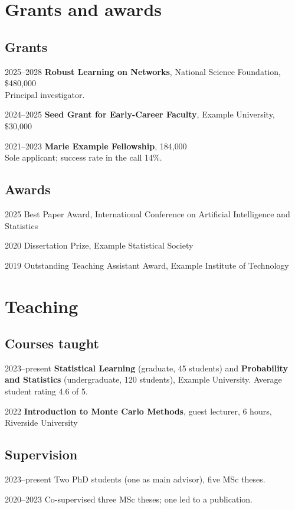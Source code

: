 \documentclass[11pt,a4paper]{article}
\begin{document}
\section{Grants and awards}
\subsection{Grants}
\begin{cvlist}
  \item[2025--2028] \textbf{Robust Learning on Networks}, National Science Foundation, \$480{,}000\\
    Principal investigator.
  \item[2024--2025] \textbf{Seed Grant for Early-Career Faculty}, Example University, \$30{,}000
  \item[2021--2023] \textbf{Marie Example Fellowship}, \texteuro{}184{,}000\\
    Sole applicant; success rate in the call 14\%.
\end{cvlist}
\subsection{Awards}
\begin{cvlist}
  \item[2025] Best Paper Award, International Conference on Artificial Intelligence and Statistics
  \item[2020] Dissertation Prize, Example Statistical Society
  \item[2019] Outstanding Teaching Assistant Award, Example Institute of Technology
\end{cvlist}

\section{Teaching}
\subsection{Courses taught}
\begin{cvlist}
  \item[2023--present] \textbf{Statistical Learning} (graduate, 45 students) and
    \textbf{Probability and Statistics} (undergraduate, 120 students), Example University.
    Average student rating 4.6 of 5.
  \item[2022] \textbf{Introduction to Monte Carlo Methods}, guest lecturer, 6 hours, Riverside University
\end{cvlist}
\subsection{Supervision}
\begin{cvlist}
  \item[2023--present] Two PhD students (one as main advisor), five MSc theses.
  \item[2020--2023] Co-supervised three MSc theses; one led to a publication.
\end{cvlist}
\end{document}
